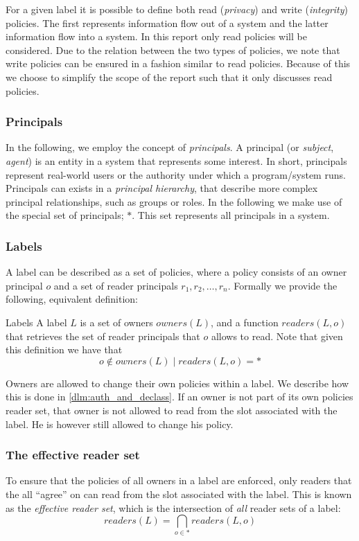 For a given label it is possible to define both read (\emph{privacy}) and write (\emph{integrity}) policies.
The first represents information flow out of a system and the latter information flow into a system.
In this report only read policies will be considered.
Due to the relation between the two types of policies, we note that write policies can be ensured in a fashion similar to read policies.
Because of this we choose to simplify the scope of the report such that it only discusses read policies.

\subsubsection{Principals}
In the following, we employ the concept of \emph{principals}.
A principal (or \emph{subject}, \emph{agent}) is an entity in a system that represents some interest.
In short, principals represent real-world users or the authority under which a program/system runs.
Principals can exists in a \emph{principal hierarchy}, that describe more complex principal relationships, such as groups or roles.
In the following we make use of the special set of principals; $*$.
This set represents all principals in a system.

\subsubsection{Labels}
A label can be described as a set of policies, where a policy consists of an owner principal $o$ and a set of reader principals $r_1, r_2, \dots, r_n$.
Formally we provide the following, equivalent definition:
\begin{definition}{Labels}
A label $L$ is a set of owners $owners(L)$, and a function $readers(L, o)$ that retrieves the set of reader principals that $o$ allows to read.
Note that given this definition we have that $$o \notin owners(L) \;|\; readers(L, o) = *$$
\end{definition}

Owners are allowed to change their own policies within a label.
We describe how this is done in \cref{dlm:auth_and_declass}.
If an owner is not part of its own policies reader set, that owner is not allowed to read from the slot associated with the label.
He is however still allowed to change his policy.

\subsubsection{The effective reader set}
To ensure that the policies of all owners in a label are enforced, only readers that the all ``agree'' on can read from the slot associated with the label.
This is known as the \emph{effective reader set}, which is the intersection of \emph{all} reader sets of a label:
$$readers(L) = \bigcap_{o \in *} readers(L, o)$$

